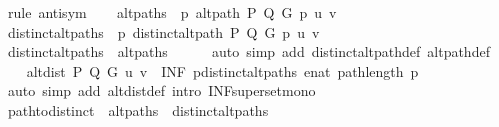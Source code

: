 \begin{isabellebody}
%
\isadelimproof
%
\endisadelimproof
%
\isatagproof
{}\isamarkupfalse%
\ {\isacharparenleft}{\kern0pt}rule\ antisym{\isacharparenright}{\kern0pt}\isanewline
\ \ \isamarkupfalse%
\ {\isacharquery}{\kern0pt}alt{\isacharunderscore}{\kern0pt}paths\ {\isacharequal}{\kern0pt}\ {\isachardoublequoteopen}{\isacharbraceleft}{\kern0pt}p{\isachardot}{\kern0pt}\ alt{\isacharunderscore}{\kern0pt}path\ P\ Q\ G\ p\ u\ v{\isacharbraceright}{\kern0pt}{\isachardoublequoteclose}\isanewline
\ \ \isamarkupfalse%
\ {\isacharquery}{\kern0pt}distinct{\isacharunderscore}{\kern0pt}alt{\isacharunderscore}{\kern0pt}paths\ {\isacharequal}{\kern0pt}\ {\isachardoublequoteopen}{\isacharbraceleft}{\kern0pt}p{\isachardot}{\kern0pt}\ distinct{\isacharunderscore}{\kern0pt}alt{\isacharunderscore}{\kern0pt}path\ P\ Q\ G\ p\ u\ v{\isacharbraceright}{\kern0pt}{\isachardoublequoteclose}\isanewline
\isanewline
\ \ \isamarkupfalse%
\ {\isachardoublequoteopen}{\isacharquery}{\kern0pt}distinct{\isacharunderscore}{\kern0pt}alt{\isacharunderscore}{\kern0pt}paths\ {\isasymsubseteq}\ {\isacharquery}{\kern0pt}alt{\isacharunderscore}{\kern0pt}paths{\isachardoublequoteclose}\isanewline
\ \ \ \ \isamarkupfalse%
\ {\isacharparenleft}{\kern0pt}auto\ simp\ add{\isacharcolon}{\kern0pt}\ distinct{\isacharunderscore}{\kern0pt}alt{\isacharunderscore}{\kern0pt}path{\isacharunderscore}{\kern0pt}def\ alt{\isacharunderscore}{\kern0pt}path{\isacharunderscore}{\kern0pt}def{\isacharparenright}{\kern0pt}\isanewline
\ \ \isamarkupfalse%
\ {\isachardoublequoteopen}alt{\isacharunderscore}{\kern0pt}dist\ P\ Q\ G\ u\ v\ {\isasymle}\ {\isacharparenleft}{\kern0pt}INF\ p{\isasymin}{\isacharquery}{\kern0pt}distinct{\isacharunderscore}{\kern0pt}alt{\isacharunderscore}{\kern0pt}paths{\isachardot}{\kern0pt}\ enat\ {\isacharparenleft}{\kern0pt}path{\isacharunderscore}{\kern0pt}length\ p{\isacharparenright}{\kern0pt}{\isacharparenright}{\kern0pt}{\isachardoublequoteclose}\isanewline
\ \ \ \ \isamarkupfalse%
\ {\isacharparenleft}{\kern0pt}auto\ simp\ add{\isacharcolon}{\kern0pt}\ alt{\isacharunderscore}{\kern0pt}dist{\isacharunderscore}{\kern0pt}def\ intro{\isacharcolon}{\kern0pt}\ INF{\isacharunderscore}{\kern0pt}superset{\isacharunderscore}{\kern0pt}mono{\isacharparenright}{\kern0pt}\isanewline
\isanewline
\ \ \isamarkupfalse%
\ {\isachardoublequoteopen}path{\isacharunderscore}{\kern0pt}to{\isacharunderscore}{\kern0pt}distinct\ {\isacharbackquote}{\kern0pt}\ {\isacharquery}{\kern0pt}alt{\isacharunderscore}{\kern0pt}paths\ {\isasymsubseteq}\ {\isacharquery}{\kern0pt}distinct{\isacharunderscore}{\kern0pt}alt{\isacharunderscore}{\kern0pt}paths{\isachardoublequoteclose}\isanewline

\end{isabellebody}
